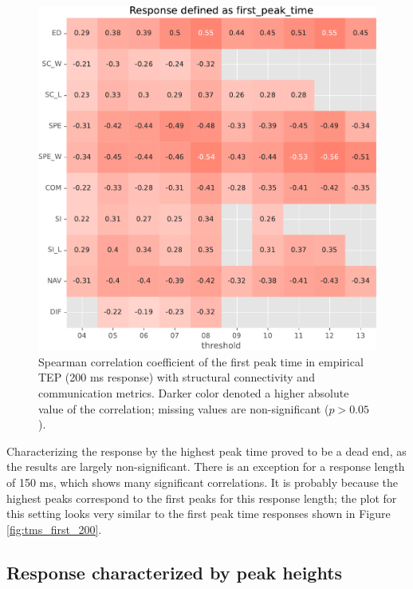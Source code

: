 \begin{figure}
    \centering
    \includegraphics[width=\textwidth]{images/nootebook_generated/pytepfit_results/empirical/200/not_over_threshold_nan/Response defined as first_peak_time.pdf}
    \caption[TEPs first peak time (200 ms) correlations]{Spearman correlation coefficient of the first peak time in empirical TEP (200 ms response) with structural connectivity and communication metrics. Darker color denoted a higher absolute value of the correlation; missing values are non-significant ($p>0.05$).}
    \label{fig:tms_first_time_200}
\end{figure}

Characterizing the response by the highest peak time proved to be a dead end, as the results are largely non-significant. There is an exception for a response length of 150 ms, which shows many significant correlations. It is probably because the highest peaks correspond to the first peaks for this response length; the plot for this setting looks very similar to the first peak time responses shown in Figure \ref{fig:tms_first_200}. 

\subsection{Response characterized by peak heights}

